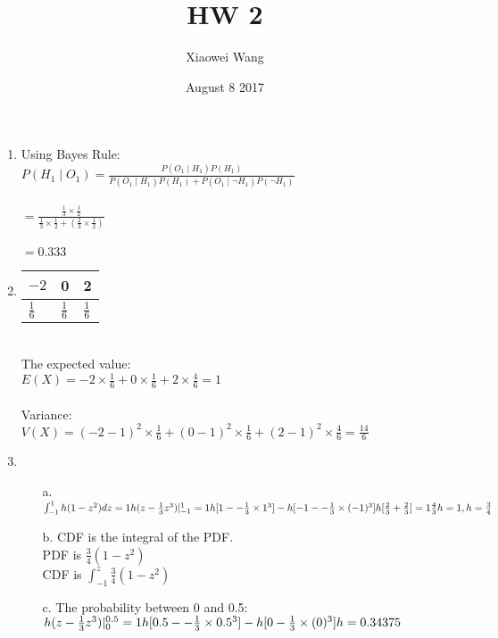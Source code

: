 \documentclass[12pt]{article}
\title{\vspace{-5.5cm}HW 2}
\author{Xiaowei Wang}
\date{August 8 2017}
\begin{document}
\maketitle


\begin{enumerate}
    \item Using Bayes Rule:
    \\ $P(H_{1}\mid O_{1})= \frac {P(O_{1}\mid H_{1})P(H_{1})}
    {P(O_{1}\mid H_{1})P(H_{1}) + P(O_{1}\mid\neg H_{1})P(\neg H_{1}) }$
    \\
    \\ $= \frac{ \frac{1}{3}\times \frac{1}{2}}
    {\frac{1}{3}\times \frac{1}{2}+ (\frac{2}{3} \times \frac{1}{2}) }$
    \\
    \\ $= 0.333 $

    \item
        \begin{tabular}{ L  L  L }
            $-2$ & 0 & 2 \\
            \hline\hline
            $\frac{1}{6}$ & $\frac{1}{6}$ & $\frac{1}{6}$
        \end{tabular}
        \\
        \text The expected value:
    \\$ E(\textit{X}) = -2 \times \frac{1}{6} + 0 \times \frac{1}{6} + 2 \times \frac{4}{6} = 1     $
    \\
    \\ Variance:
    \\ $ V(X) = (-2-1)^{2} \times \frac{1}{6} + (0-1)^{2} \times \frac{1}{6} + (2-1)^{2} \times \frac{4}{6} = \frac{14}{6}  $

    \item
        \begin{enumerate}
            \item [a.]
            $ \int_{-1}^{1} h(1-z^2) dz = 1 \\
            h(z- \frac{1}{3}z^3) \rvert_{-1}^{1} = 1 \\
            h [1- -\frac{1}{3} \times 1^3 ] - h [-1- -\frac{1}{3} \times (-1)^3 ] \\
            h[\frac{2}{3} + \frac{2}{3}] =1\\
            \frac{4}{3}h = 1,  h = \frac{3}{4}$ \\
            \item[b.]
            CDF is the integral of the PDF.\\
            PDF is $\frac{3}{4}(1-z^2)$ \\
            CDF is $   \int_{-1}^{z}\frac{3}{4}(1-z^2)   $ \\
            \item [c.]
            The probability between 0 and 0.5: \\
            $
            h(z- \frac{1}{3}z^3) \rvert_{0}^{0.5} = 1 \\
            h [0.5- -\frac{1}{3} \times 0.5^3 ] - h [0-\frac{1}{3} \times (0)^3 ] \\
            h = 0.34375
            $


\end{enumerate}
\end{enumerate}
\end{document}
